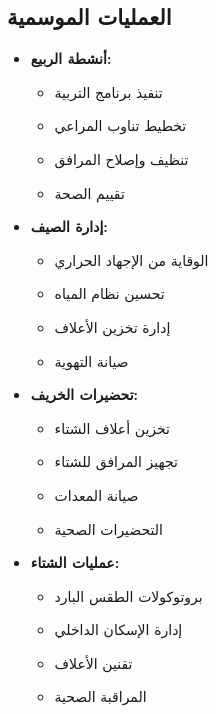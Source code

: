 \subsection{العمليات الموسمية}
\begin{itemize}
    \item \textbf{أنشطة الربيع:}
    \begin{itemize}
        \item تنفيذ برنامج التربية
        \item تخطيط تناوب المراعي
        \item تنظيف وإصلاح المرافق
        \item تقييم الصحة
    \end{itemize}
    
    \item \textbf{إدارة الصيف:}
    \begin{itemize}
        \item الوقاية من الإجهاد الحراري
        \item تحسين نظام المياه
        \item إدارة تخزين الأعلاف
        \item صيانة التهوية
    \end{itemize}
    
    \item \textbf{تحضيرات الخريف:}
    \begin{itemize}
        \item تخزين أعلاف الشتاء
        \item تجهيز المرافق للشتاء
        \item صيانة المعدات
        \item التحضيرات الصحية
    \end{itemize}
    
    \item \textbf{عمليات الشتاء:}
    \begin{itemize}
        \item بروتوكولات الطقس البارد
        \item إدارة الإسكان الداخلي
        \item تقنين الأعلاف
        \item المراقبة الصحية
    \end{itemize}
\end{itemize}

